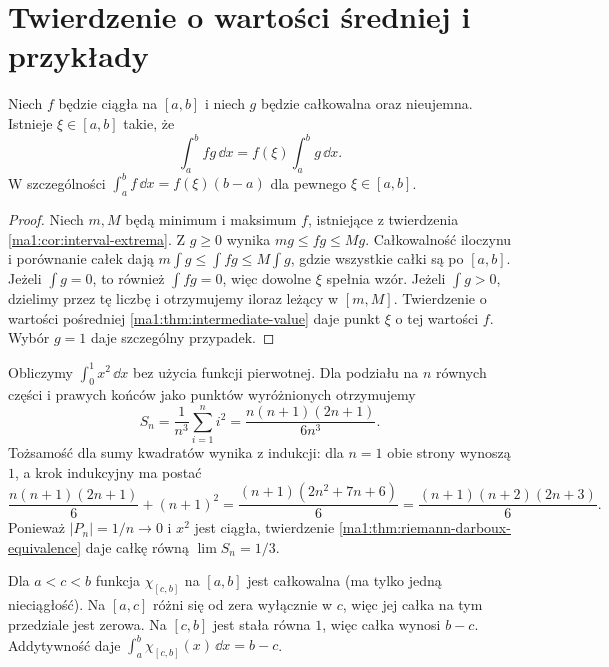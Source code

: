 \section{Twierdzenie o wartości średniej i przykłady}
\begin{twierdzenie}
\label{ma1:thm:riemann-mean-value}
Niech $f$ będzie ciągła na $[a,b]$ i niech $g$ będzie całkowalna oraz nieujemna. Istnieje $\xi\in[a,b]$ takie, że
\[
 \int_a^b fg\,\dd x=f(\xi)\int_a^b g\,\dd x.
\]
W szczególności $\int_a^b f\,\dd x=f(\xi)(b-a)$ dla pewnego $\xi\in[a,b]$.
\end{twierdzenie}
\begin{proof}
Niech $m,M$ będą minimum i maksimum $f$, istniejące z twierdzenia \ref{ma1:cor:interval-extrema}. Z $g\ge0$ wynika $mg\le fg\le Mg$. Całkowalność iloczynu i porównanie całek dają
$m\int g\le\int fg\le M\int g$, gdzie wszystkie całki są po $[a,b]$.
Jeżeli $\int g=0$, to również $\int fg=0$, więc dowolne $\xi$ spełnia wzór. Jeżeli $\int g>0$, dzielimy przez tę liczbę i otrzymujemy iloraz leżący w $[m,M]$. Twierdzenie o wartości pośredniej \ref{ma1:thm:intermediate-value} daje punkt $\xi$ o tej wartości $f$. Wybór $g=1$ daje szczególny przypadek.
\end{proof}
\begin{przyklad}
\label{ma1:ex:riemann-square}
Obliczymy $\int_0^1 x^2\,\dd x$ bez użycia funkcji pierwotnej. Dla podziału na $n$ równych części i prawych końców jako punktów wyróżnionych otrzymujemy
\[
 S_n=\frac1{n^3}\sum_{i=1}^n i^2
 =\frac{n(n+1)(2n+1)}{6n^3}.
\]
Tożsamość dla sumy kwadratów wynika z indukcji: dla $n=1$ obie strony wynoszą $1$, a krok indukcyjny ma postać
\[
 \frac{n(n+1)(2n+1)}6+(n+1)^2
 =\frac{(n+1)(2n^2+7n+6)}6
 =\frac{(n+1)(n+2)(2n+3)}6.
\] Ponieważ $|P_n|=1/n\to0$ i $x^2$ jest ciągła, twierdzenie \ref{ma1:thm:riemann-darboux-equivalence} daje całkę równą $\lim S_n=1/3$.
\end{przyklad}
\begin{przyklad}
\label{ma1:ex:riemann-step}
Dla $a<c<b$ funkcja $\chi_{[c,b]}$ na $[a,b]$ jest całkowalna (ma tylko jedną nieciągłość). Na $[a,c]$ różni się od zera wyłącznie w $c$, więc jej całka na tym przedziale jest zerowa. Na $[c,b]$ jest stała równa $1$, więc całka wynosi $b-c$. Addytywność daje $\int_a^b\chi_{[c,b]}(x)\,\dd x=b-c$.
\end{przyklad}

